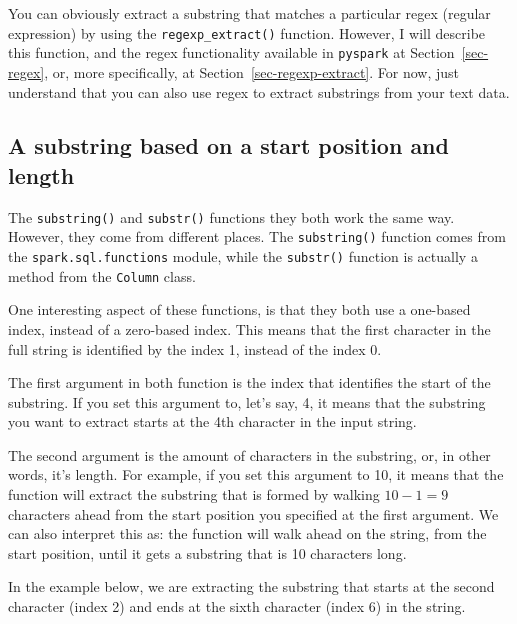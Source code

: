 \documentclass[
  11pt,
  letterpaper,
  DIV=11,
  numbers=noendperiod]{scrreprt}
\begin{document}
You can obviously extract a substring that matches a particular regex
(regular expression) by using the \texttt{regexp\_extract()} function.
However, I will describe this function, and the regex functionality
available in \texttt{pyspark} at Section~\ref{sec-regex}, or, more
specifically, at Section~\ref{sec-regexp-extract}. For now, just
understand that you can also use regex to extract substrings from your
text data.

\hypertarget{a-substring-based-on-a-start-position-and-length}{%
\subsection{A substring based on a start position and
length}\label{a-substring-based-on-a-start-position-and-length}}

The \texttt{substring()} and \texttt{substr()} functions they both work
the same way. However, they come from different places. The
\texttt{substring()} function comes from the
\texttt{spark.sql.functions} module, while the \texttt{substr()}
function is actually a method from the \texttt{Column} class.

One interesting aspect of these functions, is that they both use a
one-based index, instead of a zero-based index. This means that the
first character in the full string is identified by the index 1, instead
of the index 0.

The first argument in both function is the index that identifies the
start of the substring. If you set this argument to, let's say, 4, it
means that the substring you want to extract starts at the 4th character
in the input string.

The second argument is the amount of characters in the substring, or, in
other words, it's length. For example, if you set this argument to 10,
it means that the function will extract the substring that is formed by
walking \(10 - 1 = 9\) characters ahead from the start position you
specified at the first argument. We can also interpret this as: the
function will walk ahead on the string, from the start position, until
it gets a substring that is 10 characters long.

In the example below, we are extracting the substring that starts at the
second character (index 2) and ends at the sixth character (index 6) in
the string.
\end{document}
